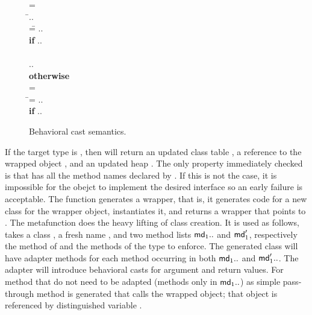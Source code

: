 \documentclass[USenglish]{tex/lipics-v2016}
\begin{document}
\begin{figure}[!h]
\hspace{8mm}\begin{minipage}{12cm}\begin{tabbing}\small
  \wrap{}\D = \\
  \HS\HS\WHERE\HS\= \Mdef\m\x{\t[1]}{\t[2]}\e\In\md[1].. \\
                 \> \mdpp[1] =\= \src{\Mdef\m\x{\tp[1]}{\tp[2]}{~\BehCast{\tp[2]}{\KCall{\FRead\that}\m{\bscast{\tp[1]}\x}{\t[1]}{\t[2]}}}} .. \\
\> \> \HS\HS \= \textbf{if} \HS \Mdef\m\x{\tp[1]}{\tp[2]}\ep\In\mdp[1].. \\
\\[-3mm]
\> \>  \src{\Mdef\m\x{\t[1]}{\t[2]}{~\KCall{\FRead\that}\m{\x}{\t[1]}{\t[2]}}} .. \\ \> \> \HS\HS \textbf{otherwise}
\\[2mm]
   = \\
\HS\HS\WHERE\HS\=\mdp[1] = \src{ \Mdef\m\x{\any}{\any}{~\BehCast\any{ \KCall{\FRead\that} \m {\bscast{\t}\x}{\t}{\tp}} } }   ..
    \HS\HS\HS\HS \\ \> \> \HS\HS \= \textbf{if} \HS \Mdef\m\x{\t}{\tp}\e\In\md[1].. \\
\end{tabbing}\end{minipage}

\vspace{-2mm}

\hrulefill
\caption{Behavioral cast semantics.}\label{behavetext}
\end{figure}

\newcommand{\W}{\xt{W}\xspace}

If the target type is \Cp, then \behcastS\a\Cp\s\K will return an updated
class table \Kp, a reference to the wrapped object \ap, and an updated heap
\sp. The only property immediately checked is that \a has all the method
names declared by \Cp. If this is not the case, it is impossible for the
obejct to implement the desired interface so an early failure is
acceptable. The function generates a wrapper, that is, it generates code for
a new class for the wrapper object, instantiates it, and returns a wrapper
\ap that points to \a. The metafunction \W does the heavy lifting of class
creation. It is used as follows, \EM{\W(\C,\md_1..,\mdp_1.., \D)} takes a
class \C, a fresh name \D, and two method lists $\md_1..$ and $\mdp_1$,
respectively the method of \C and the methods of the type to enforce.  The
generated class will have adapter methods for each method \m occurring in
both $\md_1..$ and $\mdp_1..$.  The adapter will introduce behavioral casts
for argument and return values.  For method that do not need to be adapted
(methods only in $\md_1..$) as simple pass-through method is generated that
calls the wrapped object; that object is referenced by distinguished
variable \that.
\end{document}

